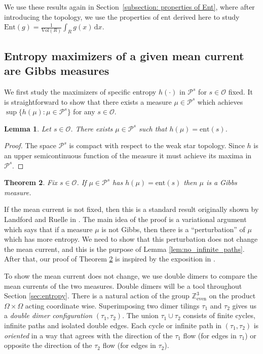 \documentclass[11pt]{article}
\newtheorem{thm}{Theorem}[subsection]
\newtheorem{lemma}[thm]{Lemma}
\theoremstyle{remark}
\theoremstyle{definition}
\newcommand{\Z}{\mathbb{Z}}
\newcommand{\Prob}{\mathcal P}
\newcommand{\ent}{\text{ent}}
\newcommand{\Ent}{\text{Ent}}
\newcommand{\threeeven}{\Z^3_{\text{even}}}
\newcommand{\mc}[1]{\mathcal{#1}}
\newcommand{\dd}{\mathrm{d}}
\begin{document}
We use these results again in Section~\ref{subsection: properties of Ent}, where after introducing the topology, we use the properties of $\ent$ derived here to study $\Ent(g) = \frac{1}{\text{Vol}(R)} \int_R g(x)\, \dd x$.


\subsection{Entropy maximizers of a given mean current are Gibbs measures}\label{subsection: entropy maximizers are Gibbs measures}

We first study the maximizers of specific entropy $h(\cdot)$ in $\mc P^{s}$ for $s\in \mc O$ fixed. It is straightforward to show that there exists a measure $\mu \in \mc P^s$ which achieves $\sup\{h(\mu):\mu \in \mc P^s\}$ for any $s\in \mc O$. 

\begin{lemma}\label{lemma: entropy maximiser}
	Let $s\in \mathcal O$. There exists $\mu \in\Prob^{s}$ such that $h(\mu)=\ent(s)$.
\end{lemma}

\begin{proof}
The space $\Prob^{s}$ is compact with respect to the weak star topology. Since $h$ is an upper semicontinuous function of the measure \cite[Theorem 4.2.4]{keller1998equilibrium} it must achieve its maxima in $\Prob^{s}$. 
\end{proof}

\begin{thm}\label{theorem: entropy maximizer gibbs}
	Fix $s\in \mc O$. If $\mu\in \mc P^s$ has $h(\mu) = \ent(s)$ then $\mu$ is a Gibbs measure.
\end{thm}

If the mean current is not fixed, then this is a standard result originally shown by Landford and Ruelle in \cite{LanfordRuelle}. The main idea of the proof is a variational argument which says that if a measure $\mu$ is not  Gibbs, then there is a ``perturbation'' of $\mu$ which has more entropy. We need to show that this perturbation does not change the mean current, and this is the purpose of Lemma \ref{lem:no_infinite_paths}. After that, our proof of Theorem \ref{theorem: entropy maximizer gibbs} is inspired by the exposition in \cite{burton1994non}. 

To show the mean current does not change, we use double dimers to compare the mean currents of the two measures. Double dimers will be a tool throughout Section \ref{sec:entropy}. There is a natural action of the group $\threeeven$ on the product $\Omega\times \Omega$ acting coordinate wise. Superimposing two dimer tilings $\tau_1$ and $\tau_2$ gives us a \emph{double dimer configuration} $(\tau_1,\tau_2)$. The union $\tau_1 \cup \tau_2$ consists of finite cycles, infinite paths and isolated double edges. Each cycle or infinite path in $(\tau_1,\tau_2)$ is {\em oriented} in a way that agrees with the direction of the $\tau_1$ flow (for edges in $\tau_1$) or opposite the direction of the $\tau_2$ flow (for edges in $\tau_2$).
\end{document}
